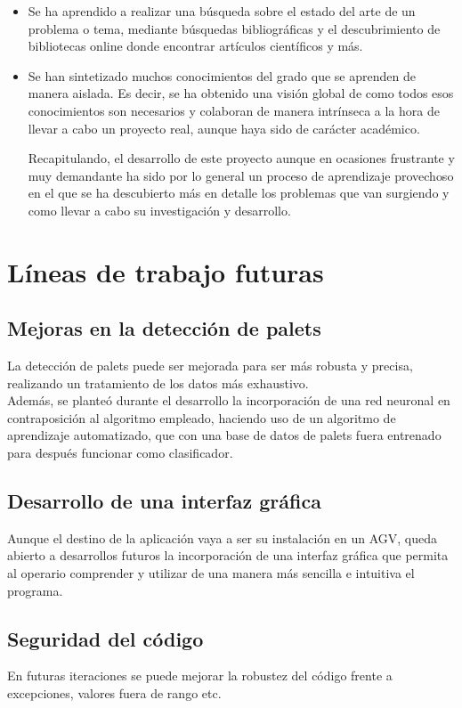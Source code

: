 \begin{itemize}
\item Se ha aprendido a realizar una búsqueda sobre el estado del arte de un problema o tema, mediante búsquedas bibliográficas y el descubrimiento de bibliotecas online donde encontrar artículos científicos y más.

\item Se han sintetizado muchos conocimientos del grado que se aprenden de manera aislada. Es decir, se ha obtenido una visión global de como todos esos conocimientos son necesarios y colaboran de manera intrínseca a la hora de llevar a cabo un proyecto real, aunque haya sido de carácter académico.

Recapitulando, el desarrollo de este proyecto aunque en ocasiones frustrante y muy demandante ha sido por lo general un proceso de aprendizaje provechoso en el que se ha descubierto más en detalle los problemas que van surgiendo y como llevar a cabo su investigación y desarrollo.

\end{itemize}

\section{Líneas de trabajo futuras}

\subsection{Mejoras en la detección de palets}
La detección de palets puede ser mejorada para ser más robusta y precisa, realizando un tratamiento de los datos más exhaustivo.\\
Además, se planteó durante el desarrollo la incorporación de una red neuronal en contraposición al algoritmo empleado, haciendo uso de un algoritmo de aprendizaje automatizado, que con una base de datos de palets fuera entrenado para después funcionar como clasificador.

\subsection{Desarrollo de una interfaz gráfica}
Aunque el destino de la aplicación vaya a ser su instalación en un AGV, queda abierto a desarrollos futuros la incorporación de una interfaz gráfica que permita al operario comprender y utilizar de una manera más sencilla e intuitiva el programa. 

\subsection{Seguridad del código}
En futuras iteraciones se puede mejorar la robustez del código frente a excepciones, valores fuera de rango etc.

